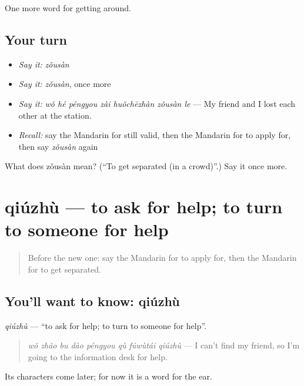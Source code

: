 \begin{grammarlens}[title={What you've built}]
One more word for getting around.
\end{grammarlens}

\subsection*{Your turn}
\begin{itemize}
\raggedright
  \item \emph{Say it:} \emph{zǒusàn}
  \item \emph{Say it:} \emph{zǒusàn}, once more
  \item \emph{Say it:} \emph{wǒ hé péngyou zài huǒchēzhàn zǒusàn le} — My friend and I lost each other at the station.
  \item \emph{Recall:} say the Mandarin for still valid, then the Mandarin for to apply for, then say \emph{zǒusàn} again
\end{itemize}

\begin{tcolorbox}[breakable,colback=teal!4,colframe=teal!35!black,title={Before you move on}]
What does zǒusàn mean? (\textquotedblleft{}To get separated (in a crowd)\textquotedblright{}.) Say it once more.
\end{tcolorbox}
\section[qiúzhù]{qiúzhù — to ask for help; to turn to someone for help}

\label{lesson:ZH-C456-qiuzhu}



\begin{quote}
Before the new one: say the Mandarin for to apply for, then the Mandarin for to get separated.
\end{quote}

\subsection*{You'll want to know: qiúzhù}
\emph{qiúzhù} — \textquotedblleft{}to ask for help; to turn to someone for help\textquotedblright{}.

\begin{quote}
\emph{wǒ zhǎo bu dào péngyou qù fúwùtái qiúzhù} — I can't find my friend, so I'm going to the information desk for help.
\end{quote}

Its characters come later; for now it is a word for the ear.

